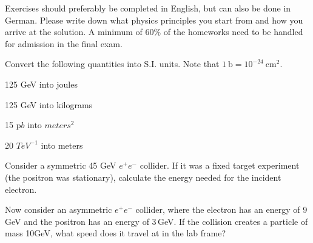 



\newcommand{\sheetnr}{1}
\newcommand{\issued}{23.10.2016}
\newcommand{\dueUni}{30.10.2016 10:00}

\newcommand{\dd}{\text{d}}

\def\bra#1{\mathinner{\langle{#1}|}}
\def\ket#1{\mathinner{|{#1}\rangle}}
\def\braket#1{\mathinner{\langle{#1}\rangle}}
\def\Bra#1{\left<#1\right|}
\def\Ket#1{\left|#1\right>}
\def\delslash{\partial\hskip-1.1ex/}

\newcommand{\ee}{\ensuremath{{e^{+}e^{-}}}\xspace}
\newcommand{\mm}{\ensuremath{{\mu^{+}\mu^{-}}}\xspace}
\newcommand{\tautau}{\ensuremath{{\tau^{+}\tau^{-}}}\xspace}
\newcommand{\nunu}{\ensuremath{{\nu\nubar}}\xspace}
\newcommand{\ellell}{\ensuremath{{\ell^{+}\ell^{-}}}\xspace}
\newcommand{\ff}{\ensuremath{{f\hskip-0.3ex\bar{f}}}\xspace}
\newcommand{\ffbar}{\ff}
\newcommand{\Afb}{\ensuremath{A_\mathrm{FB}}\xspace}
\newcommand{\Alr}{\ensuremath{A_\mathrm{LR}}\xspace}
\newcommand{\Ae}{\ensuremath{\mathcal{A}_e}\xspace}
\newcommand{\Af}{\ensuremath{\mathcal{A}_f}\xspace}
\newcommand{\Pe}{\ensuremath{\mathcal{P}_e}\xspace}
\newcommand{\Pf}{\ensuremath{\mathcal{P}_f}\xspace}



\startsheet

Exercises should preferably be completed in English, but can also be done in German. 
Please write down what physics principles you start from and how you arrive at the solution.
A minimum of 60\% of the homeworks need to be handled for admission in the final exam. 


Convert the following quantities into S.I. units. Note that $1~\mathrm{b} = 10^{-24}~\mathrm{cm}^{2}$.

\begin{subtasks}
\item 125 GeV into joules
\item 125 GeV into kilograms
\item 15 p$b$ into $meters^{2}$
\item 20 $TeV^{-1}$ into meters
\end{subtasks}


\begin{subtasks}
\item Consider a symmetric 45 GeV $e^{+}e^{-}$ collider. If it was a fixed target experiment (the positron was stationary), calculate the energy needed for the incident electron.
\item Now consider an asymmetric $e^{+}e^{-}$ collider, where the electron has an energy of 9\,GeV and the positron has an energy of 3\,GeV. If the collision creates a particle of mass 10GeV, what speed does it travel at in the lab frame?
\end{subtasks}

